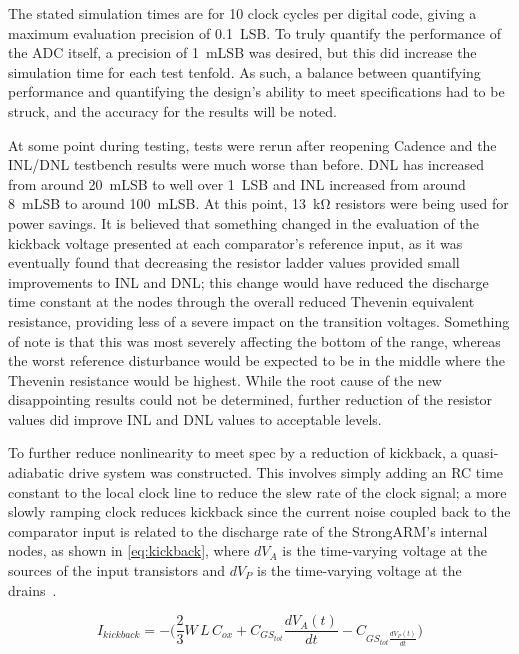 \documentclass[11pt,letterpaper]{article}
\begin{document}
The stated simulation times are for 10 clock cycles per digital code, giving a maximum evaluation precision of \qty{0.1}{LSB}. To truly quantify the performance of the ADC itself, a precision of \qty{1}{mLSB} was desired, but this did increase the simulation time for each test tenfold. As such, a balance between quantifying performance and quantifying the design's ability to meet specifications had to be struck, and the accuracy for the results will be noted. 

At some point during testing, tests were rerun after reopening Cadence and the INL/DNL testbench results were much worse than before. DNL has increased from around \qty{20}{mLSB} to well over \qty{1}{LSB} and INL increased from around \qty{8}{mLSB} to around \qty{100}{mLSB}. At this point, \qty{13}{\kilo\ohm} resistors were being used for power savings. It is believed that something changed in the evaluation of the kickback voltage presented at each comparator's reference input, as it was eventually found that decreasing the resistor ladder values provided small improvements to INL and DNL\@; this change would have reduced the discharge time constant at the nodes through the overall reduced Thevenin equivalent resistance, providing less of a severe impact on the transition voltages. Something of note is that this was most severely affecting the bottom of the range, whereas the worst reference disturbance would be expected to be in the middle where the Thevenin resistance would be highest. While the root cause of the new disappointing results could not be determined, further reduction of the resistor values did improve INL and DNL values to acceptable levels. 

To further reduce nonlinearity to meet spec by a reduction of kickback, a quasi-adiabatic drive system was constructed. This involves simply adding an RC time constant to the local clock line to reduce the slew rate of the clock signal; a more slowly ramping clock reduces kickback since the current noise coupled back to the comparator input is related to the discharge rate of the StrongARM's internal nodes, as shown in \cref{eq:kickback}, where \(dV_A\) is the time-varying voltage at the sources of the input transistors and \(dV_P\) is the time-varying voltage at the drains~\cite{Yousefirad2021}. 

\begin{equation}
    I_{kickback} = -\biggl(\frac{2}{3}W\,L\,C_{ox} + C_{GS_{tot}}\frac{dV_A(t)}{dt} - C_{GS_{tot}\frac{dV_P(t)}{dt}}\biggr)\label{eq:kickback}
\end{equation}
\end{document}
